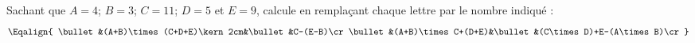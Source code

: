 Sachant que $A=4$; $B=3$; $C=11$; $D=5$ et $E=9$, calcule en
remplaçant chaque lettre par le nombre indiqué :
\[\Eqalign{
\bullet&(A+B)\times(C+D+E)\kern2cm&\bullet&C-(E-B)\cr
\bullet&(A+B)\times C+(D+E)&\bullet&(C\times D)+E-(A\times B)\cr
}\]